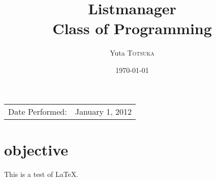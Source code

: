 \documentclass{article}
\title{Listmanager \\ Class of Programming}
\author{Yuta \textsc{Totsuka}}
\date{\today}
\begin{document}
\maketitle
\begin{center}
\begin{tabular}{l r}
Date Performed: & January 1, 2012
\end{tabular}
\end{center}

%
%

\section{objective}

This is a test of LaTeX.
\end{document}
